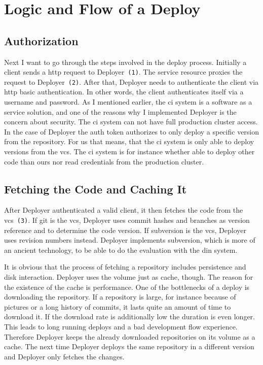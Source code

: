 \section{Logic and Flow of a Deploy}

\subsection{Authorization}

Next I want to go through the steps involved in the deploy process. Initially a client
sends a http request to Deployer~\texttt{(1)}. The service resource proxies the request
to Deployer~\texttt{(2)}. After that, Deployer needs to authenticate the client via http
basic authentication. In other words, the client authenticates itself via a username and
password. As I mentioned earlier, the \gls{ci} system is a software as a service solution,
and one of the reasons why I implemented Deployer is the concern about security. The
\gls{ci} system can not have full production cluster access. In the case of Deployer the
auth token authorizes to only deploy a specific version from the repository. For us that
means, that the \gls{ci} system is only able to deploy versions from the \gls{vcs}. The
\gls{ci} system is for instance whether able to deploy other code than ours nor read
credentials from the production cluster.

\subsection{Fetching the Code and Caching It}
\label{sec:cache}

After Deployer authenticated a valid client, it then fetches the code from the
\gls{vcs}~\texttt{(3)}. If git is the \gls{vcs}, Deployer uses commit hashes and branches
as version reference and to determine the code version. If subversion is the \gls{vcs},
Deployer uses revision numbers instead. Deployer implements subversion, which is more of
an ancient technology, to be able to do the evaluation with the \gls{din} system.

It is obvious that the process of fetching a repository includes persistence and disk
interaction. Deployer uses the volume just as cache, though. The reason for the existence
of the cache is performance. One of the bottlenecks of a deploy is downloading the
repository. If a repository is large, for instance because of pictures or a long history
of commits, it lasts quite an amount of time to download it. If the download rate is
additionally low the duration is even longer. This leads to long running deploys and a bad
development flow experience. Therefore Deployer keeps the already downloaded repositories
on its volume as a cache. The next time Deployer deploys the same repository in a
different version and Deployer only fetches the changes.

